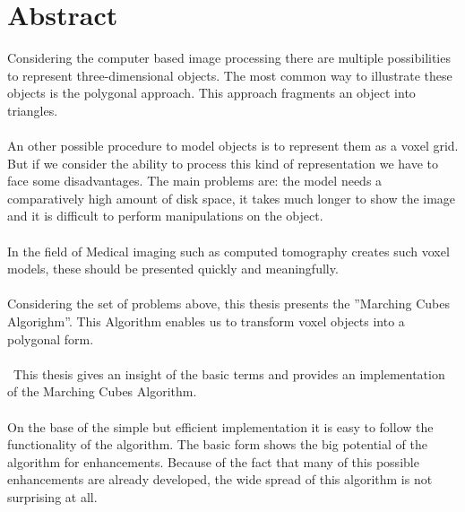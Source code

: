 \chapter{Abstract}
Considering the computer based image processing there are multiple possibilities to represent three-dimensional objects. The most common way to illustrate these objects is the polygonal approach. This approach fragments an object into triangles.
\\\\
An other possible procedure to model objects is to represent them as a voxel grid. But if we consider the ability to process this kind of representation we have to face some disadvantages. The main problems are: the model needs a comparatively high amount of disk space, it takes much longer to show the image and it is difficult to perform manipulations on the object.
\\\\
In the field of Medical imaging such as computed tomography creates such voxel models, these should be presented quickly and meaningfully.
\\\\
Considering the set of problems above, this thesis presents the ''Marching Cubes Algorighm''. This Algorithm enables us to transform voxel objects into a polygonal form. 
\\\\\
This thesis gives an insight of the basic terms and provides an implementation of the Marching Cubes Algorithm.
\\\\
On the base of the simple but efficient implementation it is easy to follow the functionality of the algorithm. The basic form shows the big potential of the algorithm for enhancements. Because of the fact that many of this possible enhancements are already developed, the wide spread of this algorithm is not surprising at all.